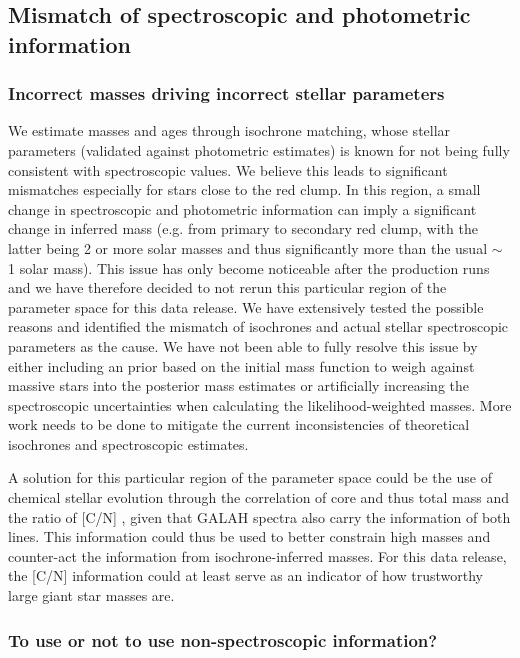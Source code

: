 \documentclass[
  journal=pasa,
  manuscript=research-paper, %
  year=2023,
  volume=37
]{cup-journal}
\begin{document}
\subsection{Mismatch of spectroscopic and photometric information} \label{sec:caveats_photospec}

\subsubsection{Incorrect masses driving incorrect stellar parameters}

We estimate masses and ages through isochrone matching, whose stellar parameters (validated against photometric estimates) is known for not being fully consistent with spectroscopic values.
We believe this leads to significant mismatches especially for stars close to the red clump. In this region, a small change in spectroscopic and photometric information can imply a significant change in inferred mass (e.g. from primary to secondary red clump, with the latter being 2 or more solar masses and thus significantly more than the usual $\sim$ 1 solar mass). This issue has only become noticeable after the production runs and we have therefore decided to not rerun this particular region of the parameter space for this data release. We have extensively tested the possible reasons and identified the mismatch of isochrones and actual stellar spectroscopic parameters as the cause. We have not been able to fully resolve this issue by either including an prior based on the initial mass function to weigh against massive stars \citep[see e.g.][]{Sharma2018} into the posterior mass estimates or artificially increasing the spectroscopic uncertainties when calculating the likelihood-weighted masses. More work needs to be done to mitigate the current inconsistencies of theoretical isochrones and spectroscopic estimates.

A solution for this particular region of the parameter space could be the use of chemical stellar evolution through the correlation of core and thus total mass and the ratio of [C/N] \citep{Masseron2015, Martig2016}, given that GALAH spectra also carry the information of both lines. This information could thus be used to better constrain high masses and counter-act the information from isochrone-inferred masses. For this data release, the [C/N] information could at least serve as an indicator of how trustworthy large giant star masses are.

\subsubsection{To use or not to use non-spectroscopic information?}
\end{document}
